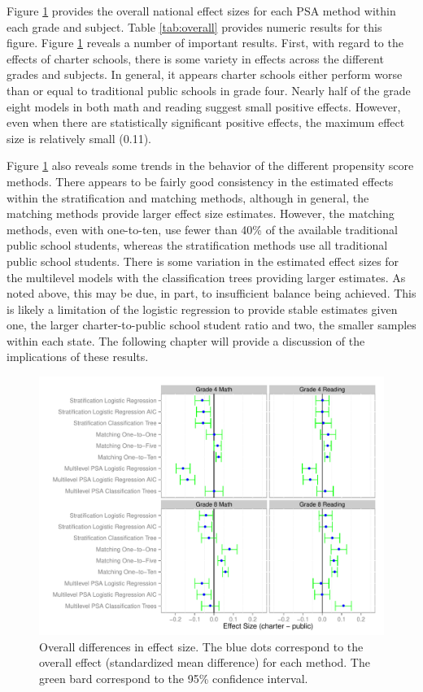 \documentclass[letterpaper,12p,twoside]{article} %
\begin{document}
Figure \ref{fig:overalldiff} provides the overall national effect sizes for each PSA method within each grade and subject. Table \ref{tab:overall} provides numeric results for this figure. Figure \ref{fig:overalldiff} reveals a number of important results. First, with regard to the effects of charter schools, there is some variety in effects across the different grades and subjects. In general, it appears charter schools either perform worse than or equal to traditional public schools in grade four. Nearly half of the grade eight models in both math and reading suggest small positive effects. However, even when there are statistically significant positive effects, the maximum effect size is relatively small (0.11). 


Figure \ref{fig:overalldiff} also reveals some trends in the behavior of the different propensity score methods. There appears to be fairly good consistency in the estimated effects within the stratification and matching methods, although in general, the matching methods provide larger effect size estimates. However, the matching methods, even with one-to-ten, use fewer than 40\% of the available traditional public school students, whereas the stratification methods use all traditional public school students. There is some variation in the estimated effect sizes for the multilevel models with the classification trees providing larger estimates. As noted above, this may be due, in part, to insufficient balance being achieved. This is likely a limitation of the logistic regression to provide stable estimates given one, the larger charter-to-public school student ratio and two, the smaller samples within each state. The following chapter will provide a discussion of the implications of these results.

\begin{figure}[t]
\begin{center}
\includegraphics[width=\textwidth]{../Figures2009/Overall.pdf}
\caption[Overall differences in effect size]{Overall differences in effect size. The blue dots correspond to the overall effect (standardized mean difference) for each method. The green bard correspond to the 95\% confidence interval.}
\label{fig:overalldiff}
\end{center}
\end{figure}
\end{document}

